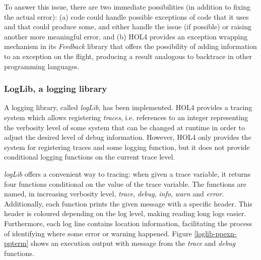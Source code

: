 \documentclass[10pt,a4paper]{article}
\begin{document}
\begin{multicols}{2}
To answer this issue, there are two immediate possibilities (in addition to fixing the actual error): (a) code could handle possible exceptions of code that it uses and that could produce some, and either handle the issue (if possible) or raising another more meaningful error, and (b) HOL4 provides an exception wrapping mechanism in its \textit{Feedback} library that offers the possibility of adding information to an exception on the flight, producing a result analogous to backtrace in other programming languages.

\subsubsection{LogLib, a logging library} \label{loglib}

A logging library, called \textit{logLib}, has been implemented. HOL4 provides a tracing system which allows registering \textit{traces}, i.e. references to an integer representing the verbosity level of some system that can be changed at runtime in order to adjust the desired level of debug information. However, HOL4 only provides the system for registering traces and some logging function, but it does not provide conditional logging functions on the current trace level.

\textit{logLib} offers a convenient way to tracing: when given a trace variable, it returns four functions conditional on the value of the trace variable. The functions are named, in increasing verbosity level, \textit{trace}, \textit{debug}, \textit{info}, \textit{warn} and \textit{error}. Additionally, each function prints the given message with a specific header. This header is coloured depending on the log level, making reading long logs easier. Furthermore, each log line contains location information, facilitating the process of identifying where some error or warning happened. Figure \ref{loglib-ppexn-ppterm} shows an execution output with message from the \textit{trace} and \textit{debug} functions.


\end{multicols}
\end{document}
